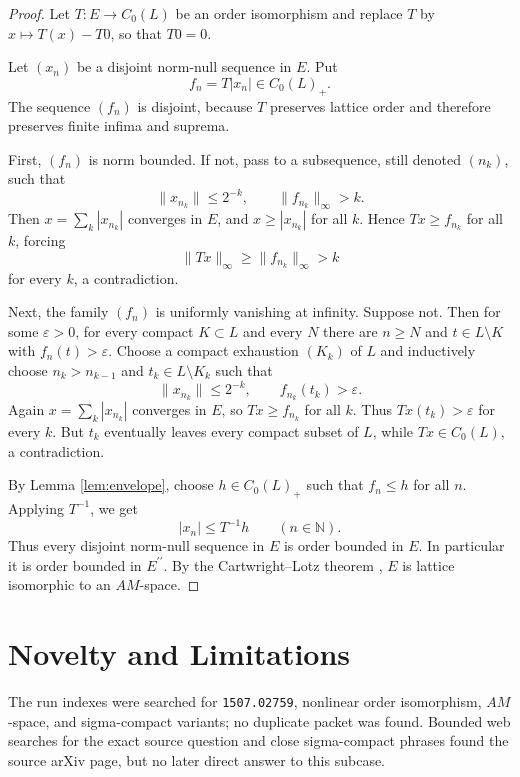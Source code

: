 \documentclass[11pt]{article}
\newcommand{\N}{\mathbb N}
\begin{document}
\begin{proof}
Let \(T:E\to C_0(L)\) be an order isomorphism and replace \(T\) by
\(x\mapsto T(x)-T0\), so that \(T0=0\).

Let \((x_n)\) be a disjoint norm-null sequence in \(E\).  Put
\[
  f_n=T|x_n|\in C_0(L)_+ .
\]
The sequence \((f_n)\) is disjoint, because \(T\) preserves lattice order and
therefore preserves finite infima and suprema.

First, \((f_n)\) is norm bounded.  If not, pass to a subsequence, still denoted
\((n_k)\), such that
\[
  \|x_{n_k}\|\le 2^{-k},\qquad \|f_{n_k}\|_\infty>k .
\]
Then \(x=\sum_k |x_{n_k}|\) converges in \(E\), and \(x\ge |x_{n_k}|\) for all
\(k\).  Hence \(Tx\ge f_{n_k}\) for all \(k\), forcing
\[
  \|Tx\|_\infty\ge \|f_{n_k}\|_\infty>k
\]
for every \(k\), a contradiction.

Next, the family \((f_n)\) is uniformly vanishing at infinity.  Suppose not.
Then for some \(\varepsilon>0\), for every compact \(K\subset L\) and every
\(N\) there are \(n\ge N\) and \(t\in L\setminus K\) with
\(f_n(t)>\varepsilon\).  Choose a compact exhaustion \((K_k)\) of \(L\) and
inductively choose \(n_k>n_{k-1}\) and \(t_k\in L\setminus K_k\) such that
\[
  \|x_{n_k}\|\le2^{-k},\qquad f_{n_k}(t_k)>\varepsilon .
\]
Again \(x=\sum_k |x_{n_k}|\) converges in \(E\), so \(Tx\ge f_{n_k}\) for all
\(k\).  Thus \(Tx(t_k)>\varepsilon\) for every \(k\).  But \(t_k\) eventually
leaves every compact subset of \(L\), while \(Tx\in C_0(L)\), a contradiction.

By Lemma \ref{lem:envelope}, choose \(h\in C_0(L)_+\) such that \(f_n\le h\)
for all \(n\).  Applying \(T^{-1}\), we get
\[
  |x_n|\le T^{-1}h\qquad(n\in\N).
\]
Thus every disjoint norm-null sequence in \(E\) is order bounded in \(E\).
In particular it is order bounded in \(E^{\prime\prime}\).  By the
Cartwright--Lotz theorem \cite{CartwrightLotz}, \(E\) is lattice isomorphic to
an \(AM\)-space.
\end{proof}

\section*{Novelty and Limitations}

The run indexes were searched for \texttt{1507.02759}, nonlinear order
isomorphism, \(AM\)-space, and sigma-compact variants; no duplicate packet was
found.  Bounded web searches for the exact source question and close
sigma-compact phrases found the source arXiv page, but no later direct answer
to this subcase.
\end{document}
